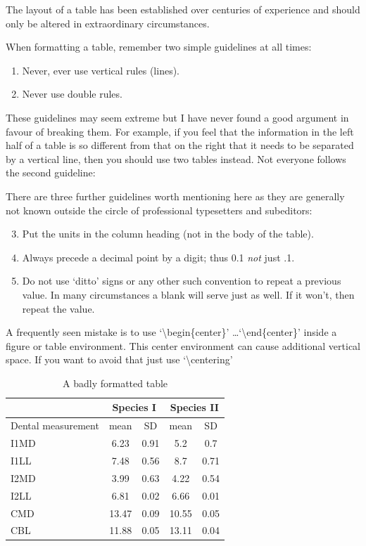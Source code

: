 \documentclass[a4paper,12pt,times,print,index, custombib]{PhDThesisPSnPDF}\usepackage[]{graphicx}\usepackage[]{color}
\begin{document}
The layout of a table has been established over centuries of experience and 
should only be altered in extraordinary circumstances. 

When formatting a table, remember two simple guidelines at all times:

\begin{enumerate}
  \item Never, ever use vertical rules (lines).
  \item Never use double rules.
\end{enumerate}

These guidelines may seem extreme but I have
never found a good argument in favour of breaking them. For
example, if you feel that the information in the left half of
a table is so different from that on the right that it needs
to be separated by a vertical line, then you should use two
tables instead. Not everyone follows the second guideline:

There are three further guidelines worth mentioning here as they
are generally not known outside the circle of professional
typesetters and subeditors:

\begin{enumerate}\setcounter{enumi}{2}
  \item Put the units in the column heading (not in the body of
          the table).
  \item Always precede a decimal point by a digit; thus 0.1
      {\em not} just .1.
  \item Do not use `ditto' signs or any other such convention to
      repeat a previous value. In many circumstances a blank
      will serve just as well. If it won't, then repeat the value.
\end{enumerate}

A frequently seen mistake is to use `\textbackslash begin\{center\}' \dots `\textbackslash end\{center\}' inside a figure or table environment. This center environment can cause additional vertical space. If you want to avoid that just use `\textbackslash centering'


\begin{table}
\caption{A badly formatted table}
\centering
\label{table:bad_table}
\begin{tabular}{|l|c|c|c|c|}
\hline 
& \multicolumn{2}{c}{Species I} & \multicolumn{2}{c|}{Species II} \\ 
\hline
Dental measurement  & mean & SD  & mean & SD  \\ \hline 
\hline
I1MD & 6.23 & 0.91 & 5.2  & 0.7  \\
\hline 
I1LL & 7.48 & 0.56 & 8.7  & 0.71 \\
\hline 
I2MD & 3.99 & 0.63 & 4.22 & 0.54 \\
\hline 
I2LL & 6.81 & 0.02 & 6.66 & 0.01 \\
\hline 
CMD & 13.47 & 0.09 & 10.55 & 0.05 \\
\hline 
CBL & 11.88 & 0.05 & 13.11 & 0.04\\ 
\hline 
\end{tabular}
\end{table}
\end{document}
